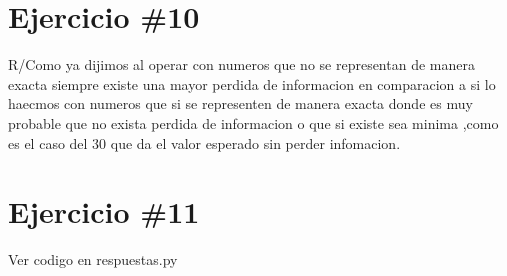 \documentclass[a4paper,12pt]{article}
\begin{document}
\section*{Ejercicio \#10}

R/Como ya dijimos al operar con numeros que no se representan de manera exacta siempre existe una mayor perdida de informacion 
en comparacion a si lo haecmos con numeros que si se representen de manera exacta donde es muy probable que no exista perdida de informacion
o que si existe sea minima ,como es el caso del 30 que da el valor esperado sin perder infomacion.

\section*{Ejercicio \#11}

Ver codigo en respuestas.py


\end{document}
